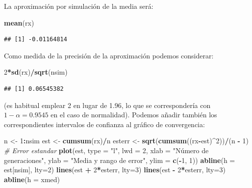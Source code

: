 \documentclass[]{book}
\newenvironment{Shaded}{\begin{snugshade}}{\end{snugshade}}
\newcommand{\KeywordTok}[1]{\textcolor[rgb]{0.13,0.29,0.53}{\textbf{#1}}}
\newcommand{\DataTypeTok}[1]{\textcolor[rgb]{0.13,0.29,0.53}{#1}}
\newcommand{\DecValTok}[1]{\textcolor[rgb]{0.00,0.00,0.81}{#1}}
\newcommand{\StringTok}[1]{\textcolor[rgb]{0.31,0.60,0.02}{#1}}
\newcommand{\CommentTok}[1]{\textcolor[rgb]{0.56,0.35,0.01}{\textit{#1}}}
\newcommand{\OperatorTok}[1]{\textcolor[rgb]{0.81,0.36,0.00}{\textbf{#1}}}
\newcommand{\NormalTok}[1]{#1}
\theoremstyle{definition}
\theoremstyle{definition}
\theoremstyle{definition}
\theoremstyle{remark}
\begin{document}
La aproximación por simulación de la media será:

\begin{Shaded}
\begin{Highlighting}[]
\KeywordTok{mean}\NormalTok{(rx)}
\end{Highlighting}
\end{Shaded}

\begin{verbatim}
## [1] -0.01164814
\end{verbatim}

Como medida de la precisión de la aproximación podemos considerar:

\begin{Shaded}
\begin{Highlighting}[]
\DecValTok{2}\OperatorTok{*}\KeywordTok{sd}\NormalTok{(rx)}\OperatorTok{/}\KeywordTok{sqrt}\NormalTok{(nsim)}
\end{Highlighting}
\end{Shaded}

\begin{verbatim}
## [1] 0.06545382
\end{verbatim}

(es habitual emplear 2 en lugar de 1.96, lo que se correspondería con
\(1 - \alpha = 0.9545\) en el caso de normalidad). Podemos añadir
también los correspondientes intervalos de confianza al gráfico de
convergencia:

\begin{Shaded}
\begin{Highlighting}[]
\NormalTok{n <-}\StringTok{ }\DecValTok{1}\OperatorTok{:}\NormalTok{nsim}
\NormalTok{est <-}\StringTok{ }\KeywordTok{cumsum}\NormalTok{(rx)}\OperatorTok{/}\NormalTok{n}
\NormalTok{esterr <-}\StringTok{ }\KeywordTok{sqrt}\NormalTok{(}\KeywordTok{cumsum}\NormalTok{((rx}\OperatorTok{-}\NormalTok{est)}\OperatorTok{^}\DecValTok{2}\NormalTok{))}\OperatorTok{/}\NormalTok{(n }\OperatorTok{-}\StringTok{ }\DecValTok{1}\NormalTok{)  }\CommentTok{# Error estandar}
\KeywordTok{plot}\NormalTok{(est, }\DataTypeTok{type =} \StringTok{"l"}\NormalTok{, }\DataTypeTok{lwd =} \DecValTok{2}\NormalTok{, }\DataTypeTok{xlab =} \StringTok{"Número de generaciones"}\NormalTok{, }
     \DataTypeTok{ylab =} \StringTok{"Media y rango de error"}\NormalTok{, }\DataTypeTok{ylim =} \KeywordTok{c}\NormalTok{(}\OperatorTok{-}\DecValTok{1}\NormalTok{, }\DecValTok{1}\NormalTok{))}
\KeywordTok{abline}\NormalTok{(}\DataTypeTok{h =}\NormalTok{ est[nsim], }\DataTypeTok{lty=}\DecValTok{2}\NormalTok{)}
\KeywordTok{lines}\NormalTok{(est }\OperatorTok{+}\StringTok{ }\DecValTok{2}\OperatorTok{*}\NormalTok{esterr, }\DataTypeTok{lty=}\DecValTok{3}\NormalTok{)}
\KeywordTok{lines}\NormalTok{(est }\OperatorTok{-}\StringTok{ }\DecValTok{2}\OperatorTok{*}\NormalTok{esterr, }\DataTypeTok{lty=}\DecValTok{3}\NormalTok{)}
\KeywordTok{abline}\NormalTok{(}\DataTypeTok{h =}\NormalTok{ xmed)}
\end{Highlighting}
\end{Shaded}
\end{document}
